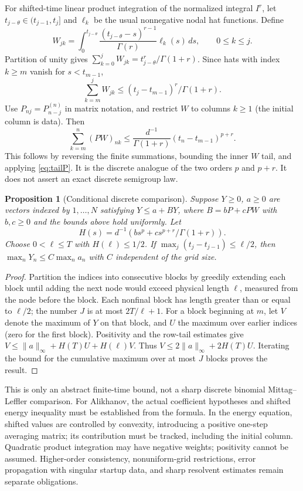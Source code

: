 \documentclass[11pt,a4paper]{article}
\newtheorem{proposition}{Proposition}[section]
\newcommand{\norm}[1]{\lVert#1\rVert}
\begin{document}
For shifted-time linear product integration of the normalized integral $I^r$, let $t_{j-\theta}\in(t_{j-1},t_j]$ and $\ell_k$ be the usual nonnegative nodal hat functions. Define
\[
 W_{jk}=\int_0^{t_{j-\theta}}\frac{(t_{j-\theta}-s)^{r-1}}{\Gamma(r)}\ell_k(s)\,ds,\qquad 0\le k\le j.
\]
Partition of unity gives $\sum_{k=0}^j W_{jk}=t_{j-\theta}^r/\Gamma(1+r)$. Since hats with index $k\ge m$ vanish for $s<t_{m-1}$,
\[
 \sum_{k=m}^j W_{jk}\le (t_j-t_{m-1})^r/\Gamma(1+r).
\]
Use $P_{nj}=P_{n-j}^{(n)}$ in matrix notation, and restrict $W$ to columns $k\ge1$ (the initial column is data). Then
\begin{equation}
 \sum_{k=m}^n(PW)_{nk}
 \le \frac{d^{-1}}{\Gamma(1+r)}(t_n-t_{m-1})^{p+r}.\label{eq:tailPW}
\end{equation}
This follows by reversing the finite summations, bounding the inner $W$ tail, and applying \eqref{eq:tailP}. It is the discrete analogue of the two orders $p$ and $p+r$. It does not assert an exact discrete semigroup law.

\begin{proposition}[Conditional discrete comparison]
Suppose $Y\ge0$, $a\ge0$ are vectors indexed by $1,\ldots,N$ satisfying $Y\le a+BY$, where $B=bP+cPW$ with $b,c\ge0$ and the bounds above hold uniformly. Let
\[
 H(s)=d^{-1}\left(bs^p+cs^{p+r}/\Gamma(1+r)\right).
\]
Choose $0<\ell\le T$ with $H(\ell)\le 1/2$. If $\max_j(t_j-t_{j-1})\le\ell/2$, then $\max_n Y_n\le C\max_n a_n$ with $C$ independent of the grid size.
\end{proposition}
\begin{proof}
Partition the indices into consecutive blocks by greedily extending each block until adding the next node would exceed physical length $\ell$, measured from the node before the block. Each nonfinal block has length greater than or equal to $\ell/2$; the number $J$ is at most $2T/\ell+1$. For a block beginning at $m$, let $V$ denote the maximum of $Y$ on that block, and $U$ the maximum over earlier indices (zero for the first block). Positivity and the row-tail estimates give $V\le \norm a_\infty+H(T)U+H(\ell)V$. Thus $V\le 2\norm a_\infty+2H(T)U$. Iterating the bound for the cumulative maximum over at most $J$ blocks proves the result.
\end{proof}
This is only an abstract finite-time bound, not a sharp discrete binomial Mittag--Leffler comparison. For Alikhanov, the actual coefficient hypotheses and shifted energy inequality must be established from the formula. In the energy equation, shifted values are controlled by convexity, introducing a positive one-step averaging matrix; its contribution must be tracked, including the initial column. Quadratic product integration may have negative weights; positivity cannot be assumed. Higher-order consistency, nonuniform-grid restrictions, error propagation with singular startup data, and sharp resolvent estimates remain separate obligations.
\end{document}
